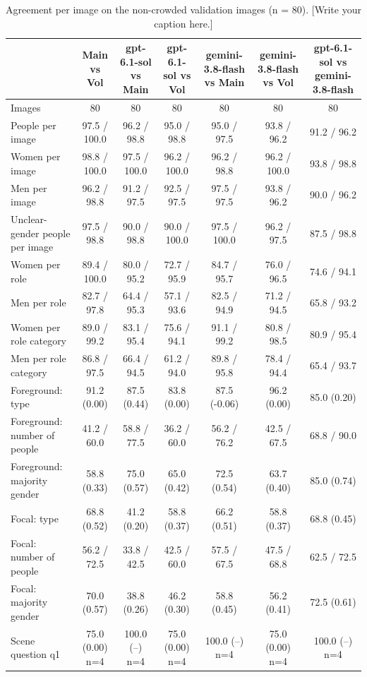 \begin{table}[t]
\centering
\scriptsize
\begin{tabular}{@{}lcccccc@{}}
\toprule
 & \textbf{Main vs Vol} & \textbf{gpt-6.1-sol vs Main} & \textbf{gpt-6.1-sol vs Vol} & \textbf{gemini-3.8-flash vs Main} & \textbf{gemini-3.8-flash vs Vol} & \textbf{gpt-6.1-sol vs gemini-3.8-flash} \\
\midrule
Images & 80 & 80 & 80 & 80 & 80 & 80 \\
People per image & 97.5 / 100.0 & 96.2 / 98.8 & 95.0 / 98.8 & 95.0 / 97.5 & 93.8 / 96.2 & 91.2 / 96.2 \\
Women per image & 98.8 / 100.0 & 97.5 / 100.0 & 96.2 / 100.0 & 96.2 / 98.8 & 96.2 / 100.0 & 93.8 / 98.8 \\
Men per image & 96.2 / 98.8 & 91.2 / 97.5 & 92.5 / 97.5 & 97.5 / 97.5 & 93.8 / 96.2 & 90.0 / 96.2 \\
Unclear-gender people per image & 97.5 / 98.8 & 90.0 / 98.8 & 90.0 / 100.0 & 97.5 / 100.0 & 96.2 / 97.5 & 87.5 / 98.8 \\
Women per role & 89.4 / 100.0 & 80.0 / 95.2 & 72.7 / 95.9 & 84.7 / 95.7 & 76.0 / 96.5 & 74.6 / 94.1 \\
Men per role & 82.7 / 97.8 & 64.4 / 95.3 & 57.1 / 93.6 & 82.5 / 94.9 & 71.2 / 94.5 & 65.8 / 93.2 \\
Women per role category & 89.0 / 99.2 & 83.1 / 95.4 & 75.6 / 94.1 & 91.1 / 99.2 & 80.8 / 98.5 & 80.9 / 95.4 \\
Men per role category & 86.8 / 97.5 & 66.4 / 94.5 & 61.2 / 94.0 & 89.8 / 95.8 & 78.4 / 94.4 & 65.4 / 93.7 \\
Foreground: type & 91.2 (0.00) & 87.5 (0.44) & 83.8 (0.00) & 87.5 (-0.06) & 96.2 (0.00) & 85.0 (0.20) \\
Foreground: number of people & 41.2 / 60.0 & 58.8 / 77.5 & 36.2 / 60.0 & 56.2 / 76.2 & 42.5 / 67.5 & 68.8 / 90.0 \\
Foreground: majority gender & 58.8 (0.33) & 75.0 (0.57) & 65.0 (0.42) & 72.5 (0.54) & 63.7 (0.40) & 85.0 (0.74) \\
Focal: type & 68.8 (0.52) & 41.2 (0.20) & 58.8 (0.37) & 66.2 (0.51) & 58.8 (0.37) & 68.8 (0.45) \\
Focal: number of people & 56.2 / 72.5 & 33.8 / 42.5 & 42.5 / 60.0 & 57.5 / 67.5 & 47.5 / 68.8 & 62.5 / 72.5 \\
Focal: majority gender & 70.0 (0.57) & 38.8 (0.26) & 46.2 (0.30) & 58.8 (0.45) & 56.2 (0.41) & 72.5 (0.61) \\
Scene question q1 & 75.0 (0.00) n=4 & 100.0 (--) n=4 & 75.0 (0.00) n=4 & 100.0 (--) n=4 & 75.0 (0.00) n=4 & 100.0 (--) n=4 \\
\bottomrule
\end{tabular}
\caption{Agreement per image on the non-crowded validation images (n = 80). [Write your caption here.]}
\label{tab:human-validation}
\end{table}
